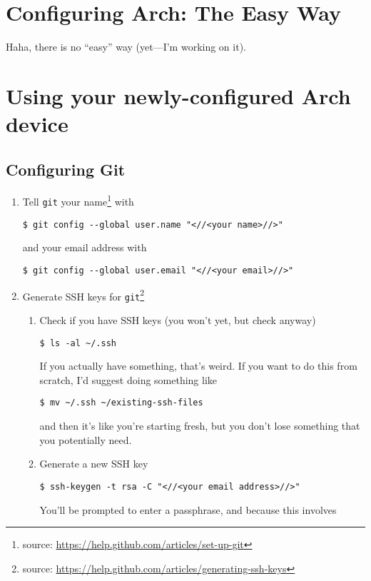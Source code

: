 \documentclass[12pt,letterpaper]{article}
\begin{document}
\section{Configuring Arch: The Easy Way}
Haha, there is no ``easy'' way (yet---I'm working on it).

\section{Using your newly-configured Arch device}

\subsection{Configuring Git}

\begin{enumerate}
  \item Tell \lstinline{git} your name\footnote{source: \url{https://help.github.com/articles/set-up-git}} with
    \begin{lstlisting}
$ git config --global user.name "<//<your name>//>"
    \end{lstlisting}
    and your email address with
    \begin{lstlisting}
$ git config --global user.email "<//<your email>//>"
    \end{lstlisting}
  \item Generate SSH keys for \lstinline{git}\footnote{source:
      \url{https://help.github.com/articles/generating-ssh-keys}}
    \begin{enumerate}
      \item Check if you have SSH keys (you won't yet, but check anyway)
        \begin{lstlisting}
$ ls -al ~/.ssh
        \end{lstlisting}
        If you actually have something, that's weird.  If you want to do this
        from scratch, I'd suggest doing something like
        \begin{lstlisting}
$ mv ~/.ssh ~/existing-ssh-files
        \end{lstlisting}
        and then it's like you're starting fresh, but you don't lose something
        that you potentially need.
      \item Generate a new SSH key
        \begin{lstlisting}
$ ssh-keygen -t rsa -C "<//<your email address>//>"
        \end{lstlisting}
        You'll be prompted to enter a passphrase, and because this involves

\end{enumerate}
\end{enumerate}
\end{document}
